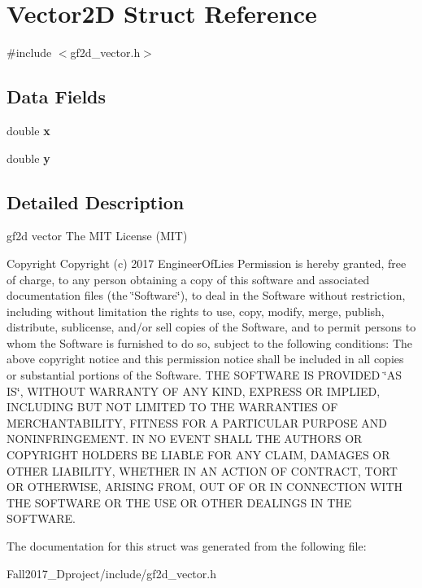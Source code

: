 \hypertarget{struct_vector2_d}{}\section{Vector2D Struct Reference}
\label{struct_vector2_d}


{\ttfamily \#include $<$gf2d\+\_\+vector.\+h$>$}

\subsection*{Data Fields}
\begin{DoxyCompactItemize}
\item 
\mbox{\label{struct_vector2_d_af88b946fb90d5f08b5fb740c70e98c10}} 
double {\bfseries x}
\item 
\mbox{\label{struct_vector2_d_ab927965981178aa1fba979a37168db2a}} 
double {\bfseries y}
\end{DoxyCompactItemize}


\subsection{Detailed Description}
gf2d vector  The M\+IT License (M\+IT) \begin{DoxyCopyright}{Copyright}
Copyright (c) 2017 Engineer\+Of\+Lies Permission is hereby granted, free of charge, to any person obtaining a copy of this software and associated documentation files (the \char`\"{}\+Software\char`\"{}), to deal in the Software without restriction, including without limitation the rights to use, copy, modify, merge, publish, distribute, sublicense, and/or sell copies of the Software, and to permit persons to whom the Software is furnished to do so, subject to the following conditions\+: The above copyright notice and this permission notice shall be included in all copies or substantial portions of the Software. T\+HE S\+O\+F\+T\+W\+A\+RE IS P\+R\+O\+V\+I\+D\+ED \char`\"{}\+A\+S I\+S\char`\"{}, W\+I\+T\+H\+O\+UT W\+A\+R\+R\+A\+N\+TY OF A\+NY K\+I\+ND, E\+X\+P\+R\+E\+SS OR I\+M\+P\+L\+I\+ED, I\+N\+C\+L\+U\+D\+I\+NG B\+UT N\+OT L\+I\+M\+I\+T\+ED TO T\+HE W\+A\+R\+R\+A\+N\+T\+I\+ES OF M\+E\+R\+C\+H\+A\+N\+T\+A\+B\+I\+L\+I\+TY, F\+I\+T\+N\+E\+SS F\+OR A P\+A\+R\+T\+I\+C\+U\+L\+AR P\+U\+R\+P\+O\+SE A\+ND N\+O\+N\+I\+N\+F\+R\+I\+N\+G\+E\+M\+E\+NT. IN NO E\+V\+E\+NT S\+H\+A\+LL T\+HE A\+U\+T\+H\+O\+RS OR C\+O\+P\+Y\+R\+I\+G\+HT H\+O\+L\+D\+E\+RS BE L\+I\+A\+B\+LE F\+OR A\+NY C\+L\+A\+IM, D\+A\+M\+A\+G\+ES OR O\+T\+H\+ER L\+I\+A\+B\+I\+L\+I\+TY, W\+H\+E\+T\+H\+ER IN AN A\+C\+T\+I\+ON OF C\+O\+N\+T\+R\+A\+CT, T\+O\+RT OR O\+T\+H\+E\+R\+W\+I\+SE, A\+R\+I\+S\+I\+NG F\+R\+OM, O\+UT OF OR IN C\+O\+N\+N\+E\+C\+T\+I\+ON W\+I\+TH T\+HE S\+O\+F\+T\+W\+A\+RE OR T\+HE U\+SE OR O\+T\+H\+ER D\+E\+A\+L\+I\+N\+GS IN T\+HE S\+O\+F\+T\+W\+A\+RE. 
\end{DoxyCopyright}


The documentation for this struct was generated from the following file\+:\begin{DoxyCompactItemize}
\item 
Fall2017\+\_\+Dproject/include/gf2d\+\_\+vector.\+h\end{DoxyCompactItemize}
